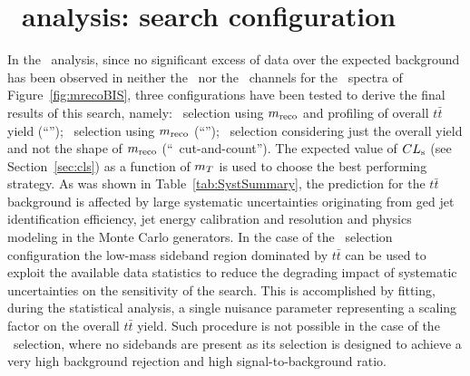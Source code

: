 \clearpage{\pagestyle{empty}\cleardoublepage}

\chapter{\wbx\ analysis: search configuration}\label{app:wbx_statanalyses}

In the \wbx\ analysis, since no significant excess of data over the 
expected background has been observed in neither the \loose\ nor
the \tight\ channels for the \mreco\ spectra 
of Figure~\ref{fig:mrecoBIS},
three configurations have been tested to derive the final
results of this search, namely: \loose\ selection using $m_{\rm reco}$ and profiling of overall $t\bar{t}$ yield (``\loose''); \tight\ selection using $m_{\rm reco}$
(``\tight''); \tight\ selection  considering just the overall yield and not 
the shape of $m_{\rm reco}$ (``\tight\ cut-and-count'').
The expected value of $CL_{\rm s}$ (see Section~\ref{sec:cls})
as a function of $m_{\T}$ is
used to choose the best performing strategy.
As was shown in Table~\ref{tab:SystSummary}, the prediction for 
the $t\bar{t}$ background is affected by 
large systematic uncertainties originating from \btag ged jet 
identification efficiency, 
jet energy calibration and resolution and physics modeling in the Monte
Carlo generators. 
In the case of the \loose\ selection configuration the low-mass sideband
region dominated by $t\bar{t}$ can be used to exploit the available data 
statistics to reduce the degrading 
impact of systematic uncertainties on the sensitivity of the search. 
This is accomplished by fitting, during the statistical analysis,
a single nuisance parameter representing a scaling factor on 
the overall $t\bar{t}$ yield. Such procedure is
not possible in the case of the \tight\ selection, where no
sidebands are present as its selection is designed 
to achieve a very high background rejection and high signal-to-background ratio.

